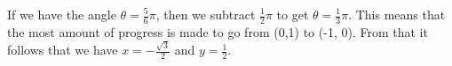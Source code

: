 \documentclass[preview]{standalone}
\begin{document}
\begin{center}
If we have the angle $\theta = \frac{5}{6} \pi$, then we subtract $\frac{1}{2} \pi$ to get $\theta = \frac{1}{3} \pi$. This means that the most amount of progress is made to go from (0,1) to (-1, 0). From that it follows that we have $x= - \frac{\sqrt{3}}{2}$ and $y=\frac{1}{2}$.
\end{center}
\end{document}
